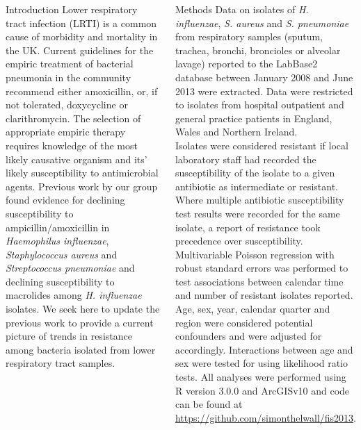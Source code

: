 \documentclass[final, 14pt]{beamer}
\begin{document}
\begin{frame}
\begin{columns}[t]
 \begin{minipage}[T]{.95\textwidth} %
  \begin{block}{Introduction}
  Lower respiratory tract infection (LRTI) is a common cause of morbidity and mortality in the UK. \citep{Davies2012}
   Current guidelines for the empiric treatment of bacterial pneumonia in the community recommend either amoxicillin, or, if not tolerated, doxycycline or clarithromycin. \citep{Lim2009}
   The selection of appropriate empiric therapy requires knowledge of the most likely causative organism and its' likely susceptibility to antimicrobial agents.
   Previous work by our group found evidence for declining susceptibility to ampicillin/amoxicillin in \textit{Haemophilus influenzae}, \textit{Staphylococcus aureus} and \textit{Streptococcus pneumoniae} and declining susceptibility to macrolides among \textit{H. influenzae} isolates. \citep{Blackburn2011}
   We seek here to update the previous work to provide a current picture of trends in resistance among bacteria isolated from lower respiratory tract samples. \\
   \end{block}
  
  \begin{block}{Methods}
Data on isolates of \textit{H. influenzae}, \textit{S. aureus} and \textit{S. pneumoniae} from respiratory samples (sputum, trachea, bronchi, broncioles or alveolar lavage) reported to the LabBase2 database between January 2008 and June 2013 were extracted. 
   Data were restricted to isolates from hospital outpatient and general practice patients in England, Wales and Northern Ireland.\\
   Isolates were considered resistant if local laboratory staff had recorded the susceptibility of the isolate to a given antibiotic as intermediate or resistant. 
   Where multiple antibiotic susceptibility test results were recorded for the same isolate, a report of resistance took precedence over susceptibility. \\
   Multivariable Poisson regression with robust standard errors was performed to test associations between calendar time and number of resistant isolates reported.
   Age, sex, year, calendar quarter and region were considered potential confounders and were adjusted for accordingly.
   Interactions between age and sex were tested for using likelihood ratio tests. 
   All analyses were performed using R version 3.0.0 and ArcGIS\texttrademark v10 and code can be found at \url{https://github.com/simonthelwall/fis2013}.
  \end{block}
  

\end{minipage}
\end{columns}
\end{frame}
\end{document}
